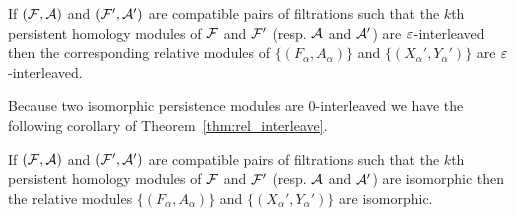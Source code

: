 \begin{theorem}\label{thm:rel_interleave}
  If $(\mathcal{F}, \mathcal{A})$ and $(\mathcal{F}', \mathcal{A}')$ are compatible pairs of filtrations such that the $k$th persistent homology modules of $\mathcal{F}$ and $\mathcal{F}'$ (resp. $\mathcal{A}$ and $\mathcal{A}'$) are $\varepsilon$-interleaved then the corresponding relative modules of $\{(F_\alpha, A_\alpha)\}$ and $\{(X_\alpha', Y_\alpha')\}$ are $\varepsilon$-interleaved.
\end{theorem}

Because two isomorphic persistence modules are $0$-interleaved we have the following corollary of Theorem~\ref{thm:rel_interleave}.

\begin{corollary}\label{cor:rel_interleave_iso}
  If $(\mathcal{F}, \mathcal{A})$ and $(\mathcal{F}', \mathcal{A}')$ are compatible pairs of filtrations such that the $k$th persistent homology modules of $\mathcal{F}$ and $\mathcal{F}'$ (resp. $\mathcal{A}$ and $\mathcal{A}'$) are isomorphic then the relative modules $\{(F_\alpha, A_\alpha)\}$ and $\{(X_\alpha', Y_\alpha')\}$ are isomorphic.
\end{corollary}

